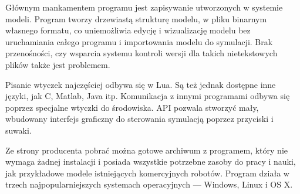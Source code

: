 		Głównym mankamentem programu jest zapisywanie utworzonych w systemie modeli.
		Program tworzy drzewiastą strukturę modelu, w pliku binarnym własnego formatu, co uniemożliwia edycję i wizualizację modelu bez uruchamiania całego programu 
		i importowania modelu do symulacji.
		Brak przenośności, czy wsparcia systemu kontroli wersji dla takich nietekstowych plików także jest problemem.

		Pisanie wtyczek najczęściej odbywa się w Lua. Są też jednak dostępne inne języki, jak C, Matlab, Java itp.
		Komunikacja z innymi programami odbywa się poprzez specjalne wtyczki do środowiska.
		API pozwala stworzyć mały, wbudowany interfejs graficzny do sterowania symulacją poprzez przyciski i suwaki.

		Ze strony producenta pobrać można gotowe archiwum z programem, który nie wymaga żadnej instalacji i posiada wszystkie potrzebne zasoby do pracy i nauki, 
		jak przykładowe modele istniejących komercyjnych robotów.
		Program działa w trzech najpopularniejszych systemach operacyjnych --- Windows, Linux i OS X.

